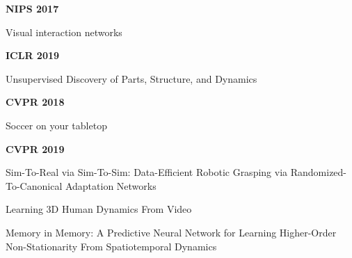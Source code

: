 \documentclass[12pt]{article}
\begin{document}
\textbf{NIPS 2017}

Visual interaction networks \cite{watters2017visual}



\textbf{ICLR 2019}

Unsupervised Discovery of Parts, Structure, and Dynamics
\cite{xu2019unsupervised}

\textbf{CVPR 2018}

Soccer on your tabletop \cite{rematas2018soccer}


\textbf{CVPR 2019}

Sim-To-Real via Sim-To-Sim: Data-Efficient Robotic Grasping via
Randomized-To-Canonical Adaptation Networks \cite{James_2019_CVPR}

Learning 3D Human Dynamics From Video \cite{Kanazawa_2019_CVPR}

Memory in Memory: A Predictive Neural Network for Learning Higher-Order
Non-Stationarity From Spatiotemporal Dynamics \cite{Wang_2019_CVPR}





\end{document}

